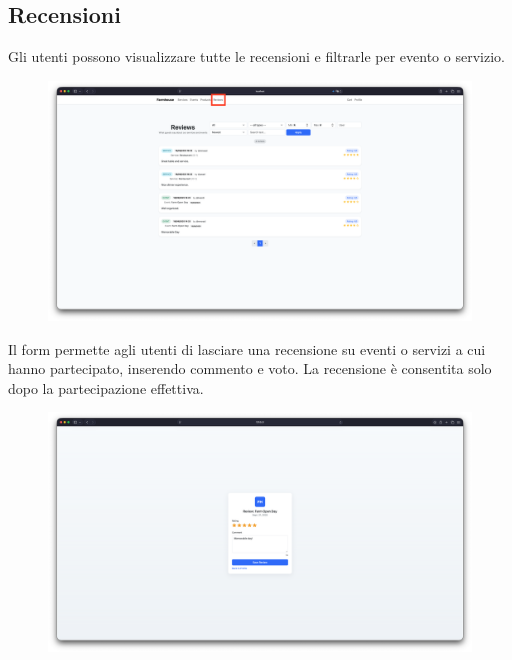 \documentclass[a4paper,12pt]{report}
\begin{document}
\subsection*{Recensioni}
Gli utenti possono visualizzare tutte le recensioni e filtrarle per evento o servizio.

\begin{figure}[H]
    \centering
    \includegraphics[width=\textwidth, trim=0 0 0 0]{./img/users/reviews.png}
    \vspace{-1em}
    \label{fig:recensione}
\end{figure}

Il form permette agli utenti di lasciare una recensione su eventi o servizi a cui hanno partecipato, 
inserendo commento e voto. La recensione è consentita solo dopo la partecipazione effettiva.

\begin{figure}[H]
    \centering
    \includegraphics[width=\textwidth, trim=0 0 0 0]{./img/users/give_review.png}
    \vspace{-1em}
    \label{fig:lascia recensione}
\end{figure}
\end{document}

